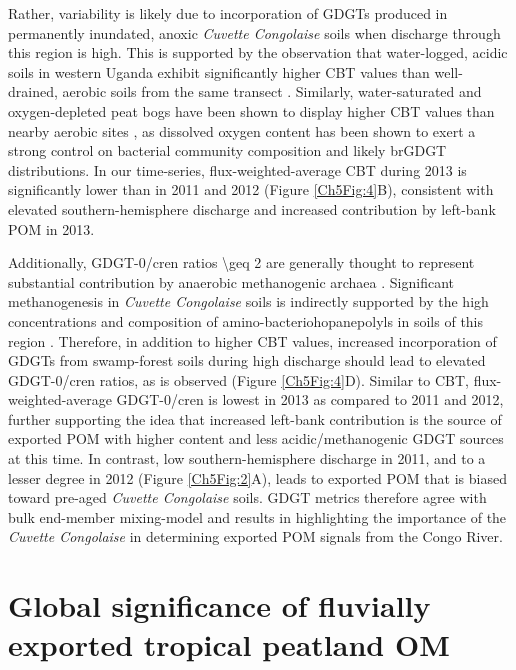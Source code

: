 Rather, variability is likely due to incorporation of GDGTs produced in permanently inundated, anoxic \textit{Cuvette Congolaise} soils when discharge through this region is high. This is supported by the observation that water-logged, acidic soils in western Uganda exhibit significantly higher CBT values than well-drained, aerobic soils from the same transect \citep{Loomis:2011dr}. Similarly, water-saturated and oxygen-depleted peat bogs have been shown to display higher CBT values than nearby aerobic sites \citep{Huguet:2010di}, as dissolved oxygen content has been shown to exert a strong control on bacterial community composition \citep{Hansel:2008hp} and likely brGDGT distributions. In our time-series, flux-weighted-average CBT during 2013 is significantly lower than in 2011 and 2012 (Figure \ref{Ch5Fig:4}B), consistent with elevated southern-hemisphere discharge and increased contribution by left-bank POM in 2013.

Additionally, GDGT-0/cren ratios \num{\geq 2} are generally thought to represent substantial contribution by anaerobic methanogenic archaea \citep{Blaga:2009ge}. Significant methanogenesis in \textit{Cuvette Congolaise} soils is indirectly supported by the high concentrations and  composition of amino-bacteriohopanepolyls in soils of this region \citep{Talbot:2014jd,SpencerJones:2015bn}. Therefore, in addition to higher CBT values, increased incorporation of GDGTs from swamp-forest soils during high discharge should lead to elevated GDGT-0/cren ratios, as is observed (Figure \ref{Ch5Fig:4}D). Similar to CBT, flux-weighted-average GDGT-0/cren is lowest in 2013 as compared to 2011 and 2012, further supporting the idea that increased left-bank contribution is the source of exported POM with higher  content and less acidic/methanogenic GDGT sources at this time. In contrast, low southern-hemisphere discharge in 2011, and to a lesser degree in 2012 (Figure \ref{Ch5Fig:2}A), leads to exported POM that is biased toward pre-aged \textit{Cuvette Congolaise} soils. GDGT metrics therefore agree with bulk end-member mixing-model and  results in highlighting the importance of the \textit{Cuvette Congolaise} in determining exported POM signals from the Congo River.

\section{Global significance of fluvially exported tropical peatland OM}

